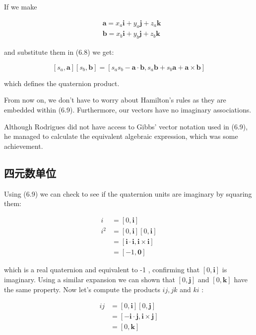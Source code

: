 If we make

$$
    \begin{aligned}
         & \mathbf{a}=x_{a} \mathbf{i}+y_{a} \mathbf{j}+z_{a} \mathbf{k} \\
         & \mathbf{b}=x_{b} \mathbf{i}+y_{b} \mathbf{j}+z_{b} \mathbf{k}
    \end{aligned}
$$

and substitute them in (6.8) we get:

$$
    \left[s_{a}, \mathbf{a}\right]\left[s_{b}, \mathbf{b}\right]=\left[s_{a} s_{b}-\mathbf{a} \cdot \mathbf{b}, s_{a} \mathbf{b}+s_{b} \mathbf{a}+\mathbf{a} \times \mathbf{b}\right]
$$

which defines the quaternion product.

From now on, we don't have to worry about Hamilton's rules as they are embedded within (6.9). Furthermore, our vectors have no imaginary associations.

Although Rodrigues did not have access to Gibbs' vector notation used in (6.9), he managed to calculate the equivalent algebraic expression, which was some achievement.

\subsection{四元数单位}
Using (6.9) we can check to see if the quaternion units are imaginary by squaring them:

$$
    \begin{aligned}
        i     & =[0, \mathbf{i}]                                             \\
        i^{2} & =[0, \mathbf{i}][0, \mathbf{i}]                              \\
              & =[\mathbf{i} \cdot \mathbf{i}, \mathbf{i} \times \mathbf{i}] \\
              & =[-1, \mathbf{0}]
    \end{aligned}
$$

which is a real quaternion and equivalent to -1 , confirming that $[0, \mathbf{i}]$ is imaginary. Using a similar expansion we can shown that $[0, \mathbf{j}]$ and $[0, \mathbf{k}]$ have the same property. Now let's compute the products $i j, j k$ and $k i$ :

$$
    \begin{aligned}
        i j & =[0, \mathbf{i}][0, \mathbf{j}]                               \\
            & =[-\mathbf{i} \cdot \mathbf{j}, \mathbf{i} \times \mathbf{j}] \\
            & =[0, \mathbf{k}]
    \end{aligned}
$$

